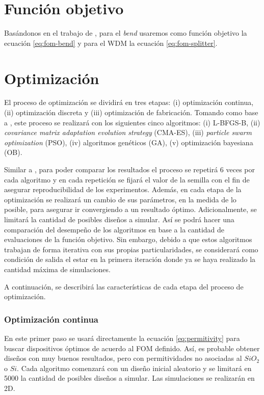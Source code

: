 \section{Función objetivo}

Basándonos en el trabajo de \cite{Su2020}, para el \emph{bend} usaremos como función objetivo la ecuación \ref{eq:fom-bend} y para el WDM la ecuación \ref{eq:fom-splitter}.

\section{Optimización}

El proceso de optimización se dividirá en tres etapas: (i) optimización continua, (ii) optimización discreta y (iii) optimización de fabricación.
Tomando como base a \cite{Elsawy2020, Schneider2019, Gregory2015}, este proceso se realizará con los siguientes cinco algoritmos: (i) L-BFGS-B, (ii) \emph{covariance matrix adaptation evolution strategy} (CMA-ES), (iii) \emph{particle swarm optimization} (PSO), (iv) algoritmos genéticos (GA), (v) optimización bayesiana (OB).

Similar a \cite{Schneider2019}, para poder comparar los resultados el proceso se repetirá 6 veces por cada algoritmo y en cada repetición se fijará el valor de la semilla con el fin de asegurar reproducibilidad de los experimentos.
Además, en cada etapa de la optimización se realizará un cambio de sus parámetros, en la medida de lo posible, para asegurar ir convergiendo a un resultado óptimo.
Adicionalmente, se limitará la cantidad de posibles diseños a simular.
Así se podrá hacer una comparación del desempeño de los algoritmos en base a la cantidad de evaluaciones de la función objetivo.
Sin embargo, debido a que estos algoritmos trabajan de forma iterativa con sus propias particularidades, se considerará como condición de salida el estar en la primera iteración donde ya se haya realizado la cantidad máxima de simulaciones.

A continuación, se describirá las características de cada etapa del proceso de optimización.

\subsubsection{Optimización continua}

En este primer paso se usará directamente la ecuación \ref{eq:permitivity} para buscar dispositivos óptimos de acuerdo al FOM definido.
Así, es probable obtener diseños con muy buenos resultados, pero con permitividades no asociadas al $SiO_2$ o $Si$.
Cada algoritmo comenzará con un diseño inicial aleatorio y se limitará en 5000 la cantidad de posibles diseños a simular. 
Las simulaciones se realizarán en 2D.

